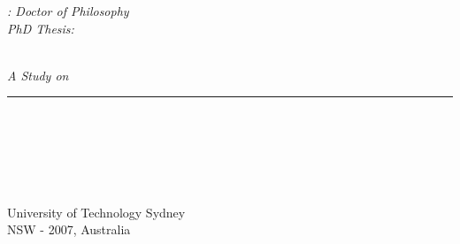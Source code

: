 {
\pagestyle{empty}
\changepage{5cm}{1cm}{-0.5cm}{-0.5cm}{}{-2cm}{}{}{}
\vspace{7mm}


{\small
\noindent 
\textit{\utscoursecode: Doctor of Philosophy}\\
\textit{PhD Thesis: \utsfield}\\
\noindent 
\textit{\DTMenglishmonthname{\utsmonth}~\utsyear}
}

\begin{center}
\par\vspace{6.5cm}

{\begin{minipage}{\textwidth}
\flushright
{
  \emph{\hfill \LARGE{A Study on}\\[.25cm]\HUGE{\utstitle}} 
}
\noindent\rule[-1ex]{\textwidth}{4pt}\\[2.5ex]
\end{minipage}}

\vspace*{4cm}
{\begin{minipage}{\textwidth}
\flushright
{%
{\huge \emph{\utsname}}\\[3ex]} 
\end{minipage}}

\par\vspace {5.5cm}
\end{center}

\noindent%
{\small \utsschool \\ 
\utsfaculty \\
University of Technology Sydney\\
NSW - 2007, Australia}
\clearpage
}

\utsclearemptydoublepage %
